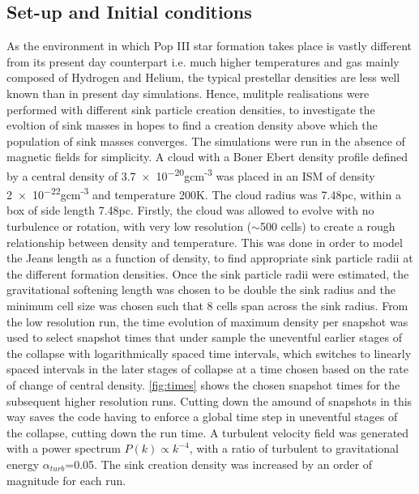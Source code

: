 \documentclass[11pt]{article}
\begin{document}
\subsection{Set-up and Initial conditions}
\label{sub:ics2}
As the environment in which Pop III star formation takes place is vastly different from its present day counterpart i.e. much higher temperatures and gas mainly composed of Hydrogen and Helium, the typical prestellar densities are less well known than in present day simulations. Hence, mulitple realisations were performed with different sink particle creation densities, to investigate the evoltion of sink masses in hopes to find a creation density above which the population of sink masses converges. The simulations were run in the absence of magnetic fields for simplicity. A cloud with a Boner Ebert density profile defined by a central density of \num{3.7e-20}gcm\textsuperscript{-3}  was placed in an ISM of density \num{2e-22}gcm\textsuperscript{-3} and temperature 200K. The cloud radius was 7.48pc, within a box of side length 7.48pc. Firstly, the cloud was allowed to evolve with no turbulence or rotation, with very low resolution ($\sim$500 cells) to create a rough relationship between density and temperature. This was done in order to model the Jeans length as a function of density, to find appropriate sink particle radii at the different formation densities. Once the sink particle radii were estimated, the gravitational softening length was chosen to be double the sink radius and the minimum cell size was chosen such that 8 cells span across the sink radius. From the low resolution run, the time evolution of maximum density per snapshot was used to select snapshot times that under sample the uneventful earlier stages of the collapse with logarithmically spaced time intervals, which switches to linearly spaced intervals in the later stages of collapse at a time chosen based on the rate of change of central density. \ref{fig:times} shows the chosen snapshot times for the subsequent higher resolution runs. Cutting down the amound of snapshots in this way saves the code having to enforce a global time step in uneventful  stages of the collapse, cutting down the run time. A turbulent velocity field was generated with a power spectrum $P(k) \propto k^{-4}$, with a ratio of turbulent to gravitational energy $\alpha_{turb}$=0.05. The sink creation density was increased by an order of magnitude for each run.
\end{document}
